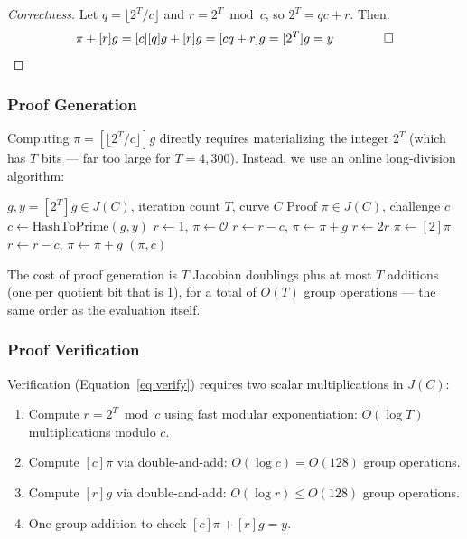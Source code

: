 \documentclass[11pt,a4paper]{article}
\begin{document}
\begin{proof}[Correctness]
Let $q = \lfloor 2^T / c \rfloor$ and $r = 2^T \bmod c$, so $2^T = qc + r$. Then:
\begin{equation}
    [c]\pi + [r]g = [c][q]g + [r]g = [cq + r]g = [2^T]g = y \qquad \qed
\end{equation}
\end{proof}

\subsubsection{Proof Generation}

Computing $\pi = [\lfloor 2^T / c \rfloor] g$ directly requires materializing the integer $2^T$ (which has $T$ bits --- far too large for $T = 4{,}300$). Instead, we use an online long-division algorithm:

\begin{algorithm}[H]
\caption{Wesolowski Proof Generation (Online Long Division)}
\label{alg:proof-gen}
\begin{algorithmic}[1]
\Require $g, y = [2^T]g \in J(C)$, iteration count $T$, curve $C$
\Ensure Proof $\pi \in J(C)$, challenge $c$
\State $c \gets \mathrm{HashToPrime}(g, y)$ 
\State $r \gets 1$, \quad $\pi \gets \mathcal{O}$ 
 $r \gets r - c$, \quad $\pi \gets \pi + g$ \EndIf
{}
    \State $r \gets 2r$ 
    \State $\pi \gets [2]\pi$ 
        \State $r \gets r - c$, \quad $\pi \gets \pi + g$ 
    \EndIf
\EndFor
\State \Return $(\pi, c)$
\end{algorithmic}
\end{algorithm}

The cost of proof generation is $T$ Jacobian doublings plus at most $T$ additions (one per quotient bit that is 1), for a total of $O(T)$ group operations --- the same order as the evaluation itself.

\subsubsection{Proof Verification}

Verification (Equation~\ref{eq:verify}) requires two scalar multiplications in $J(C)$:
\begin{enumerate}
    \item Compute $r = 2^T \bmod c$ using fast modular exponentiation: $O(\log T)$ multiplications modulo $c$.
    \item Compute $[c]\pi$ via double-and-add: $O(\log c) = O(128)$ group operations.
    \item Compute $[r]g$ via double-and-add: $O(\log r) \leq O(128)$ group operations.
    \item One group addition to check $[c]\pi + [r]g = y$.
\end{enumerate}
\end{document}
